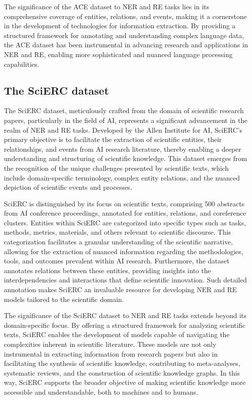 The significance of the ACE dataset to NER and RE tasks lies in its comprehensive coverage of entities, relations, and events, making it a cornerstone in the development of technologies for information extraction. By providing a structured framework for annotating and understanding complex language data, the ACE dataset has been instrumental in advancing research and applications in NER and RE, enabling more sophisticated and nuanced language processing capabilities.
\subsection{The SciERC dataset}
\label{sec:sciercdataset}
The SciERC dataset, meticulously crafted from the domain of scientific research papers, particularly in the field of \ac{AI}, represents a significant advancement in the realm of NER and RE tasks\cite{luan2018multitask}. Developed by the Allen Institute for AI, SciERC's primary objective is to facilitate the extraction of scientific entities, their relationships, and events from AI research literature, thereby enabling a deeper understanding and structuring of scientific knowledge. This dataset emerges from the recognition of the unique challenges presented by scientific texts, which include domain-specific terminology, complex entity relations, and the nuanced depiction of scientific events and processes.

SciERC is distinguished by its focus on scientific texts, comprising 500 abstracts from AI conference proceedings, annotated for entities, relations, and coreference clusters. Entities within SciERC are categorized into specific types such as tasks, methods, metrics, materials, and others relevant to scientific discourse. This categorization facilitates a granular understanding of the scientific narrative, allowing for the extraction of nuanced information regarding the methodologies, tools, and outcomes prevalent within AI research. Furthermore, the dataset annotates relations between these entities, providing insights into the interdependencies and interactions that define scientific innovation. Such detailed annotation makes SciERC an invaluable resource for developing NER and RE models tailored to the scientific domain.

The significance of the SciERC dataset to NER and RE tasks extends beyond its domain-specific focus. By offering a structured framework for analyzing scientific texts, SciERC enables the development of models capable of navigating the complexities inherent in scientific literature. These models are not only instrumental in extracting information from research papers but also in facilitating the synthesis of scientific knowledge, contributing to meta-analyses, systematic reviews, and the construction of scientific knowledge graphs. In this way, SciERC supports the broader objective of making scientific knowledge more accessible and understandable, both to machines and to humans.

